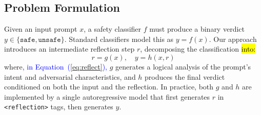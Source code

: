 \documentclass[superintelligence,article,accept,moreauthors]{Definitions/mdpi}
\newcommand{\authchg}[1]{\textcolor{blue}{#1}}
\begin{document}
\subsection{Problem Formulation}

Given an input prompt $x$, a safety classifier $f$ must produce a binary verdict \mbox{$y \in \{\texttt{safe}, \texttt{unsafe}\}$.} Standard classifiers model this as $y = f(x)$. Our approach introduces an intermediate reflection step $r$, decomposing the classification \hl{into:}
\begin{equation}
  r = g(x), \quad y = h(x, r)\label{eq:reflect}
\end{equation}
where\authchg{, in Equation~(\ref{eq:reflect}),} $g$ generates a logical analysis of the prompt's intent and adversarial characteristics, and $h$ produces the final verdict conditioned on both the input and the reflection. In practice, both $g$ and $h$ are implemented by a single autoregressive model that first generates $r$ in \texttt{<reflection>} tags, then generates $y$.
\end{document}
